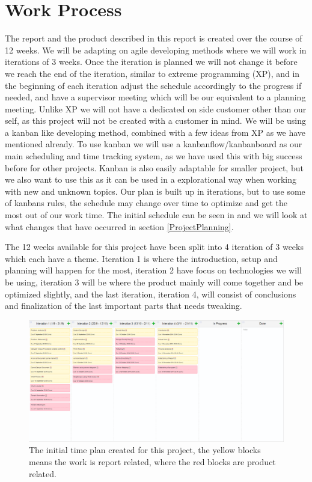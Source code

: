 \section{Work Process}
\label{WorkProcess}
The report and the product described in this report is created over the course of 12 weeks. We will be adapting on agile developing methods where we will work in iterations of 3 weeks. Once the iteration is planned we will not change it before we reach the end of the iteration, similar to extreme programming (XP), and in the beginning of each iteration adjust the schedule accordingly to the progress if needed, and have a supervisor meeting which will be our equivalent to a planning meeting. Unlike XP we will not have a dedicated on side customer other than our self, as this project will not be created with a customer in mind. We will be using a kanban like developing method, combined with a few ideas from XP as we have mentioned already. To use kanban we will use a kanbanflow/kanbanboard as our main scheduling and time tracking system, as we have used this with big success before for other projects. Kanban is also easily adaptable for smaller project, but we also want to use this as it can be used in a explorational way when working with new and unknown topics. Our plan is built up in iterations, but to use some of kanbans rules, the schedule may change over time to optimize and get the most out of our work time. The initial schedule can be seen in  and we will look at what changes that have occurred in section \ref{ProjectPlanning}.

The 12 weeks available for this project have been split into 4 iteration of 3 weeks which each have a theme. Iteration 1 is where the introduction, setup and planning will happen for the most, iteration 2 have focus on technologies we will be using, iteration 3 will be where the product mainly will come together and be optimized slightly, and the last iteration, iteration 4, will consist of conclusions and finalization of the last important parts that needs tweaking.


\begin{figure}[H]
	\includegraphics[width=1\linewidth]{img/InitTimeplan}
	\centering
	\caption{The initial time plan created for this project, the yellow blocks means the work is report related, where the red blocks are product related.}
	\label{fig:InitTimeplan}
\end{figure}
